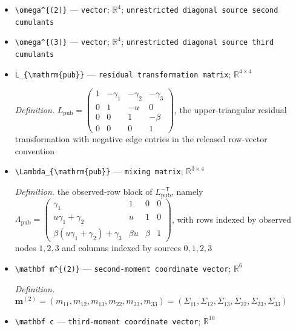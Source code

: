 \documentclass{article}
\begin{document}
\begin{itemize}
  \par\smallskip\noindent\emph{Definition.} the retained released-code variable, identified by \(\ell_{23}^{\mathrm{M2}}=\beta\)
  \item \texttt{\textbackslash{}\allowbreak{}omega\textasciicircum{}\{(2)\}\allowbreak{}} --- \texttt{vector}; \(\mathbb R^4\); \texttt{unrestricted diagonal source second cumulants}
  \item \texttt{\textbackslash{}\allowbreak{}omega\textasciicircum{}\{(3)\}\allowbreak{}} --- \texttt{vector}; \(\mathbb R^4\); \texttt{unrestricted diagonal source third cumulants}
  \item \texttt{L\_\allowbreak{}\{\textbackslash{}\allowbreak{}mathrm\{pub\}\allowbreak{}\}\allowbreak{}} --- \texttt{residual transformation matrix}; \(\mathbb R^{4\times4}\)
  \par\smallskip\noindent\emph{Definition.} \(L_{\mathrm{pub}}=\begin{pmatrix}1&-\gamma_1&-\gamma_2&-\gamma_3\\0&1&-u&0\\0&0&1&-\beta\\0&0&0&1\end{pmatrix}\), the upper-triangular residual transformation with negative edge entries in the released row-vector convention
  \item \texttt{\textbackslash{}\allowbreak{}Lambda\_\allowbreak{}\{\textbackslash{}\allowbreak{}mathrm\{pub\}\allowbreak{}\}\allowbreak{}} --- \texttt{mixing matrix}; \(\mathbb R^{3\times4}\)
  \par\smallskip\noindent\emph{Definition.} the observed-row block of \(L_{\mathrm{pub}}^{-\mathsf T}\), namely \(\Lambda_{\mathrm{pub}}=\begin{pmatrix}\gamma_1&1&0&0\\u\gamma_1+\gamma_2&u&1&0\\\beta(u\gamma_1+\gamma_2)+\gamma_3&\beta u&\beta&1\end{pmatrix}\), with rows indexed by observed nodes \(1,2,3\) and columns indexed by sources \(0,1,2,3\)
  \item \texttt{\textbackslash{}\allowbreak{}mathbf m\textasciicircum{}\{(2)\}\allowbreak{}} --- \texttt{second-\allowbreak{}moment coordinate vector}; \(\mathbb R^6\)
  \par\smallskip\noindent\emph{Definition.} \(\mathbf m^{(2)}=(m_{11},m_{12},m_{13},m_{22},m_{23},m_{33})=(\Sigma_{11},\Sigma_{12},\Sigma_{13},\Sigma_{22},\Sigma_{23},\Sigma_{33})\)
  \item \texttt{\textbackslash{}\allowbreak{}mathbf c} --- \texttt{third-\allowbreak{}moment coordinate vector}; \(\mathbb R^{10}\)

\end{itemize}
\end{document}
